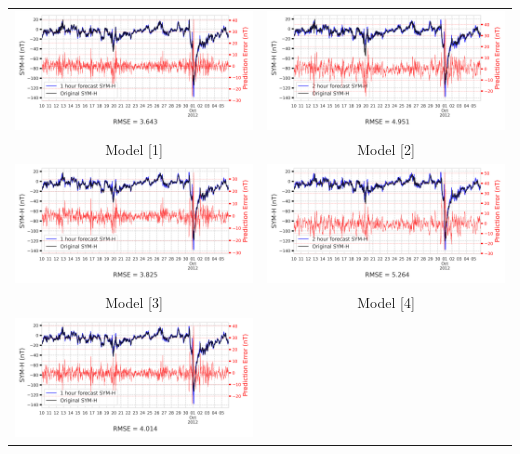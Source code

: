 \documentclass[draft,sw]{agutexSI2019}
\begin{document}
\begin{table}
\centering
\begin{tabular}{cc}
\includegraphics[width=0.49\linewidth]{paper_plots/1h_swics/1h_swics_storm_38.png}
&
\includegraphics[width=0.49\linewidth]{paper_plots/2h_swics/2h_swics_storm_38.png}
\\
Model [1] & Model [2]
\vspace*{12pt}
\\
\includegraphics[width=0.49\linewidth]{paper_plots/1h_no_swics/1h_no_swics_storm_38.png}
&
\includegraphics[width=0.49\linewidth]{paper_plots/2h_no_swics/2h_no_swics_storm_38.png}
\\
Model [3] & Model [4]
\vspace*{12pt}
\\
\includegraphics[width=0.49\linewidth]{paper_plots/1h_swics_model_on_no_swics/1h_swics_model_on_no_swics_storm_38.png}

\end{tabular}
\end{table}
\end{document}
